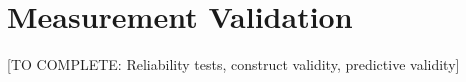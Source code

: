 \section{Measurement Validation}

[TO COMPLETE: Reliability tests, construct validity, predictive validity]